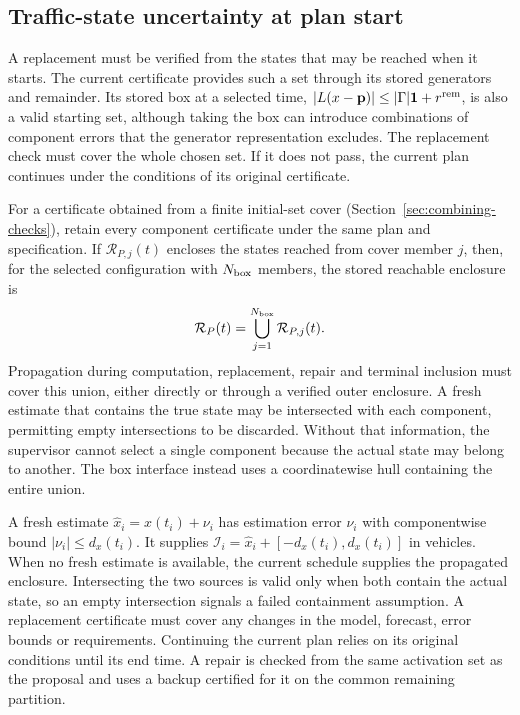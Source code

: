 \documentclass[final]{cas-sc}
\theoremstyle{definition}
\theoremstyle{plain}
\theoremstyle{definition}
\theoremstyle{plain}
\begin{document}
\subsection{Traffic-state uncertainty at plan start}
\label{sec:activation-sets}

A replacement must be verified from the states that may be reached
when it starts. The current certificate provides such a set through
its stored generators and remainder. Its stored box at a selected time,
$|L(x-\mathbf p)|\le|\Gamma|\mathbf 1+r^{\rm rem}$, is also a valid
starting set, although taking the box can introduce combinations of
component errors that the generator representation excludes. The
replacement check must cover the whole chosen set. If it does not
pass, the current plan continues under the conditions of its original
certificate.

For a certificate obtained from a finite initial-set cover
(Section~\ref{sec:combining-checks}), retain every component certificate under
the same plan and specification. If $\mathcal R_{P,j}(t)$ encloses the
states reached from cover member $j$, then, for the selected
configuration with $N_{\rm box}$ members, the stored reachable
enclosure is
\begin{equation}
\mathcal R_P(t)=\bigcup_{j=1}^{N_{\rm box}}\mathcal R_{P,j}(t).
\label{eq:covered-reachable-union}
\end{equation}
Propagation during computation, replacement, repair and terminal
inclusion must cover this union, either directly or through a verified
outer enclosure. A fresh estimate that contains the true state may be
intersected with each component, permitting empty intersections to be
discarded. Without that information, the supervisor cannot select a
single component because the actual state may belong to another. The
box interface instead uses a coordinatewise hull containing the entire
union.

A fresh estimate $\widehat x_i=x(t_i)+\nu_i$ has estimation error
$\nu_i$ with componentwise bound $|\nu_i|\le d_x(t_i)$. It supplies
$\mathcal I_i=\widehat x_i+[-d_x(t_i),d_x(t_i)]$ in vehicles. When no
fresh estimate is available, the current schedule supplies the
propagated enclosure. Intersecting the two sources is valid only when
both contain the actual state, so an empty intersection signals a
failed containment assumption. A replacement certificate must cover
any changes in the model, forecast, error bounds or requirements.
Continuing the current plan relies on its original conditions until
its end time. A repair is checked from the same activation set as the
proposal and uses a backup certified for it on the common remaining
partition.
\end{document}
